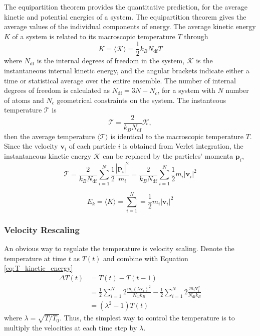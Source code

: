 The equipartition theorem provides the quantitative prediction, for the average kinetic and potential energies of a system.  The equipartition theorem gives the average values of the individual components of energy.  The average kinetic energy $K$ of a system is related to its macroscopic temperature $T$ through
\begin{equation}
  K
  =
  \langle \mathcal{K} \rangle
  =
  \frac{1}
       {2}
  k_B N_{\mathrm{df}} T
\end{equation}
where $N_{\mathrm{df}}$ is the internal degrees of freedom in the system, $\mathcal{K}$ is the instantaneous internal kinetic energy, and the angular brackets indicate either a time or statistical average over the entire ensemble.
The number of internal degrees of freedom is calculated as $N_{\mathrm{df}} = 3 N - N_c$, for a system with $N$ number of atoms and $N_c$ geometrical constraints on the system.
The instanteous temperature $\mathcal{T}$ is
\begin{equation}
  \mathcal{T}
  =
  \frac{2}
       {k_B N_{\mathrm{df}}}
  \mathcal{K},
\end{equation}
then the average temperature $\langle\mathcal{T}\rangle$ is identical to the macroscopic temperature $T$.  Since the velocity $\bm{v}_i$ of each particle $i$ is obtained from Verlet integration, the instantaneous kinetic energy $\mathcal{K}$ can be replaced by the particles' momenta $\bm{p}_i$,
\begin{equation}
  \label{eq:T_kinetic_energy}
  \mathcal{T}
  = \frac{2}
         {k_B N_{\mathrm{df}}}
    \sum_{i=1}^N
		  \frac{1}{2}
		  \frac{|\bm{p}_i|^2}{m_i}
  = \frac{2}
         {k_B N_{\mathrm{df}}}
    \sum_{i=1}^N
		     \frac{1}{2} m_i |\bm{v}_i|^2
\end{equation}

\begin{equation}
  E_k
	= \langle K \rangle = \sum_{i=1}^N
	=
	\frac{1}{2} m_i |\bm{v}_i|^2
\end{equation}

\subsubsection{Velocity Rescaling}
An obvious way to regulate the temperature is velocity scaling\cite{tadmor2011_md}.  Denote the temperature at time $t$ as $T(t)$ and combine with Equation \ref{eq:T_kinetic_energy}
\begin{align}
  \Delta T(t)
  &= T(t) - T(t-1) \\
  &= \frac{1}{2}
     \sum_{i=1}^N 2 \frac{m_i (\lambda \bm{v}_i)^2}
                         {N_{\mathrm{df}} k_B}
     -
     \frac{1}{2}
     \sum_{i=1}^N 2 \frac{m_i \bm{v}_i^2}
                         {N_{\mathrm{df}} k_B} \\
  &= (\lambda^2 - 1) T(t)
\end{align}
where $\lambda = \sqrt{T/T_0}$.  Thus, the simplest way to control the temperature is to multiply the velocities at each time step by $\lambda$.

